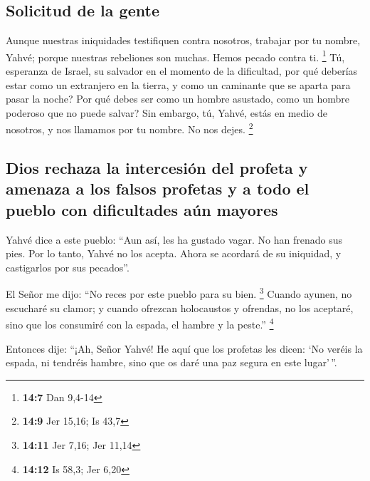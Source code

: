 \begin{paracol}{2}
\hypertarget{solicitud-de-la-gente}{%
\subsection{Solicitud de la gente}\label{solicitud-de-la-gente}}

 Aunque nuestras iniquidades testifiquen contra nosotros,
trabajar por tu nombre, Yahvé; porque nuestras rebeliones son muchas.
Hemos pecado contra ti. \footnote{\textbf{14:7} Dan 9,4-14}
 Tú, esperanza de Israel, su salvador en el momento de la
dificultad, por qué deberías estar como un extranjero en la tierra, y
como un caminante que se aparta para pasar la noche?  Por
qué debes ser como un hombre asustado, como un hombre poderoso que no
puede salvar? Sin embargo, tú, Yahvé, estás en medio de nosotros, y nos
llamamos por tu nombre. No nos dejes. \footnote{\textbf{14:9} Jer 15,16;
  Is 43,7}

\hypertarget{dios-rechaza-la-intercesiuxf3n-del-profeta-y-amenaza-a-los-falsos-profetas-y-a-todo-el-pueblo-con-dificultades-auxfan-mayores}{%
\subsection{Dios rechaza la intercesión del profeta y amenaza a los
falsos profetas y a todo el pueblo con dificultades aún
mayores}\label{dios-rechaza-la-intercesiuxf3n-del-profeta-y-amenaza-a-los-falsos-profetas-y-a-todo-el-pueblo-con-dificultades-auxfan-mayores}}

 Yahvé dice a este pueblo: ``Aun así, les ha gustado
vagar. No han frenado sus pies. Por lo tanto, Yahvé no los acepta. Ahora
se acordará de su iniquidad, y castigarlos por sus pecados''.

 El Señor me dijo: ``No reces por este pueblo para su
bien. \footnote{\textbf{14:11} Jer 7,16; Jer 11,14} 
Cuando ayunen, no escucharé su clamor; y cuando ofrezcan holocaustos y
ofrendas, no los aceptaré, sino que los consumiré con la espada, el
hambre y la peste.'' \footnote{\textbf{14:12} Is 58,3; Jer 6,20}

 Entonces dije: ``¡Ah, Señor Yahvé! He aquí que los
profetas les dicen: `No veréis la espada, ni tendréis hambre, sino que
os daré una paz segura en este lugar'\,''.


\end{paracol}
